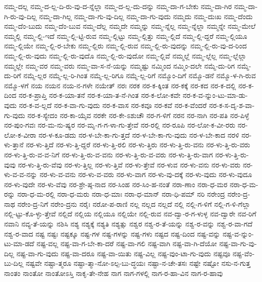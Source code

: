 {ನಮ್ಮ-ದಲ್ಲ
ನಮ್ಮ-ದ-ಲ್ಲ-ದಿ-ರು-ವು-ದ-ನ್ನೆಲ್ಲಾ
ನಮ್ಮ-ದ-ಲ್ಲ-ದು-ದನ್ನು
ನಮ್ಮ-ದಾ-ಗ-ಬೇಕು
ನಮ್ಮ-ದಾ-ಗಿರ
ನಮ್ಮ-ದಾ-ಗಿ-ರು-ವು-ದಿಲ್ಲ
ನಮ್ಮ-ದಾ-ಗಿಲ್ಲ
ನಮ್ಮ-ದಾ-ಗು-ವು-ದಿಲ್ಲ
ನಮ್ಮ-ದಾ-ಗು-ವುದು
ನಮ್ಮದು
ನಮ್ಮ-ದುಃಖ
ನಮ್ಮ-ದೆಂದು
ನಮ್ಮ-ದೆಂ-ಬುದು
ನಮ್ಮ-ದೆಂ-ಬುವ
ನಮ್ಮ-ದೆಲ್ಲ
ನಮ್ಮದೇ
ನಮ್ಮನ್ನು
ನಮ್ಮ-ನ್ನೆಲ್ಲ
ನಮ್ಮ-ನ್ನೆಲ್ಲಾ
ನಮ್ಮನ್ನೇ
ನಮ್ಮ-ಮೇಲೆ
ನಮ್ಮಲ್ಲಿ
ನಮ್ಮ-ಲ್ಲಿ-ಇದೆ
ನಮ್ಮ-ಲ್ಲಿ-ಟ್ಟಿ-ರುವ
ನಮ್ಮ-ಲ್ಲಿಟ್ಟು
ನಮ್ಮ-ಲ್ಲಿತ್ತು
ನಮ್ಮ-ಲ್ಲಿದೆ
ನಮ್ಮ-ಲ್ಲಿ-ದ್ದರೆ
ನಮ್ಮ-ಲ್ಲಿಯೂ
ನಮ್ಮ-ಲ್ಲಿಯೇ
ನಮ್ಮ-ಲ್ಲಿ-ರ-ಬೇಕು
ನಮ್ಮ-ಲ್ಲಿರು
ನಮ್ಮ-ಲ್ಲಿ-ರುವ
ನಮ್ಮ-ಲ್ಲಿ-ರು-ವುದನ್ನು
ನಮ್ಮ-ಲ್ಲಿ-ರು-ವು-ದ-ರಿಂದ
ನಮ್ಮ-ಲ್ಲಿ-ರು-ವುದು
ನಮ್ಮ-ಲ್ಲಿ-ರು-ವುದೊ
ನಮ್ಮ-ಲ್ಲಿ-ರು-ವುದೋ
ನಮ್ಮ-ಲ್ಲಿವೆ
ನಮ್ಮಲ್ಲೆ
ನಮ್ಮ-ಲ್ಲೆಲ್ಲ
ನಮ್ಮ-ಲ್ಲೆಲ್ಲಾ
ನಮ್ಮಲ್ಲೇ
ನಮ್ಮ-ವರ
ನಮ್ಮ-ವರು
ನಮ್ಮ-ವಾ-ಸ-ನೆ-ಯನ್ನು
ನಮ್ಮಷ್ಟು
ನಮ್ಮಿಂದ
ನಮ್ಮಿಂ-ದಲೇ
ನಮ್ಮೆ-ದು-ರಿಗ
ನಮ್ಮೆ-ದು-ರಿಗೆ
ನಮ್ಮೆ-ಲ್ಲರ
ನಮ್ಮೆ-ಲ್ಲ-ರಿ-ಗಿಂತ
ನಮ್ಮೆ-ಲ್ಲ-ರಿಗೂ
ನಮ್ಮೆ-ಲ್ಲ-ರಿಗೆ
ನಮ್ಮೊಂ-ದಿಗೆ
ನಮ್ಮೊ-ಡನೆ
ನಮ್ಮೊ-ಳ-ಗಿ-ರುವ
ನಮ್ಮೊ-ಳಗೆ
ನಯ
ನಯನ
ನಯ-ನ-ಗಳೇ
ನಯೇತ್
ನರಃ
ನರಕ
ನರ-ಕ-ಕ್ಕಿಂತ
ನರ-ಕಕ್ಕೆ
ನರ-ಕದ
ನರ-ಕ-ದಲ್ಲಿ
ನರ-ಕ-ದಿಂದ
ನರ-ಕ-ಪ್ರಾಪ್ತಿ
ನರ-ಕ-ಯಾ-ತನೆ
ನರ-ಕ-ಯಾ-ತ-ನೆ-ಗಿಂತ
ನರ-ಕ-ಲೋ-ಕವೇ
ನರ-ಕ-ವ-ನ್ನುಂ-ಟು-ಮಾ-ಡು-ವುದು
ನರ-ಕ-ವ-ಲ್ಲದೆ
ನರ-ಕ-ವಾ-ಗು-ವುದು
ನರ-ಕ-ವಾಸ
ನರ-ಕವೂ
ನರ-ಕವೆ
ನರ-ಕ-ವೆಂದರೆ
ನರ-ಕ-ಸ-ದೃ-ಶ-ವಾ-ಗು-ವುದು
ನರ-ಕ-ಸ್ಯೇದಂ
ನರ-ಕಾ-ಯೈವ
ನರಕೇ
ನರ-ಕೇ-ಽಶುಚೌ
ನರ-ಗ-ಳಿಗೆ
ನರನ
ನರ-ನಾಗಿ
ನರ-ಪತಿ
ನರ-ಪಿಳ್ಳೆ
ನರ-ಪುಂ-ಗವಃ
ನರ-ಮ-ನು-ಷ್ಯರ
ನರ-ಮೃ-ಗ-ಗ-ಳಾ-ಗು-ತ್ತೇವೆ
ನರ-ರಲ್ಲಿ
ನರ-ರೂಪಿ
ನರ-ಲೋ-ಕ-ವೀ-ರರು
ನರ-ಲೋ-ಕ-ವೀರಾ
ನರ-ಳ-ಕೂ-ಡದು
ನರ-ಳ-ಬೇ-ಕಾ-ಗು-ತ್ತದೆ
ನರ-ಳ-ಬೇ-ಕಾ-ಗು-ವುದು
ನರ-ಳ-ಬೇ-ಕಾದ
ನರಳಿ
ನರ-ಳು-ತ್ತಾನೆ
ನರ-ಳು-ತ್ತಿದೆ
ನರ-ಳು-ತ್ತಿ-ದ್ದರೆ
ನರ-ಳು-ತ್ತಿ-ರಲಿ
ನರ-ಳು-ತ್ತಿರು
ನರ-ಳು-ತ್ತಿ-ರು-ವನು
ನರ-ಳು-ತ್ತಿ-ರು-ವರು
ನರ-ಳು-ತ್ತಿ-ರು-ವ-ವ-ನಿಗೆ
ನರ-ಳು-ತ್ತಿ-ರು-ವ-ವನು
ನರ-ಳು-ತ್ತಿ-ರು-ವ-ವರು
ನರ-ಳು-ತ್ತಿ-ರು-ವಾಗ
ನರ-ಳು-ತ್ತಿ-ರು-ವುವು
ನರ-ಳು-ತ್ತಿ-ರು-ವೆವು
ನರ-ಳು-ತ್ತಿಲ್ಲ
ನರ-ಳು-ತ್ತಿವೆ
ನರ-ಳು-ತ್ತೇವೆ
ನರ-ಳುವ
ನರ-ಳು-ವನು
ನರ-ಳು-ವರು
ನರ-ಳು-ವ-ವ-ನನ್ನು
ನರ-ಳು-ವ-ವನು
ನರ-ಳು-ವ-ವರು
ನರ-ಳು-ವಾಗ
ನರ-ಳು-ವು-ದಕ್ಕೆ
ನರ-ಳು-ವುದು
ನರ-ಳು-ವುದೂ
ನರ-ಳು-ವುದೇ
ನರ-ಳು-ವೆವು
ನರ-ಶ್ರೇ-ಷ್ಠ-ನಾದ
ನರ-ಸಿಂಹ
ನರ-ಸಿಂ-ಹ-ನಂತೆ
ನರಾ-ಣಾಂ
ನರಾ-ಧ-ಮರ
ನರಾ-ಧ-ಮ-ರನ್ನು
ನರಾ-ಧ-ಮ-ರಲ್ಲಿ
ನರಾ-ಧ-ಮರು
ನರಾ-ಧ-ಮಾಃ
ನರಾ-ಧ-ಮಾನ್
ನರಾ-ಧಿ-ಪಮ್
ನರಿ
ನರೇಂದ್ರ
ನರೇಂ-ದ್ರ-ನಾಥ
ನರೇಂ-ದ್ರ-ನಿಗೆ
ನರೇಂ-ದ್ರನು
ನರೈಃ
ನರೋ-ಪ-ರಾಣಿ
ನಲ್ಲ
ನಲ್ಲದ
ನಲ್ಲದೆ
ನಲ್ಲಿ
ನಲ್ಲಿ-ಗ-ಳಿಗೆ
ನಲ್ಲಿ-ಗ-ಳಿ-ಗೆಲ್ಲಾ
ನಲ್ಲಿ-ಟ್ಟು-ಕೊ-ಳ್ಳು-ತ್ತೇವೆ
ನಲ್ಲಿದೆ
ನಲ್ಲಿಯ
ನಲ್ಲಿಯೂ
ನಲ್ಲಿಯೇ
ನಲ್ಲಿ-ರುವ
ನವ-ದ್ವಾ-ರ-ಗ-ಳುಳ್ಳ
ನವ-ದ್ವಾರೇ
ನವ-ರಿಗೆ
ನವಾನಿ
ನವ್ಯ-ತೆ-ಯನ್ನು
ನಶಿಸಿ
ನಶ್ಯ
ನಶ್ಯಕ್ಕೆ
ನಶ್ಯತಿ
ನಶ್ಯತ್ಸು
ನಶ್ವರ
ನಶ್ವ-ರ-ತೆ-ಯನ್ನು
ನಶ್ವ-ರ-ವನ್ನು
ನಶ್ವ-ರ-ವಾ-ಗದೆ
ನಶ್ವ-ರ-ವಾದ
ನಷ್ಟ
ನಷ್ಟಃ
ನಷ್ಟಕ್ಕೂ
ನಷ್ಟ-ಗಳ
ನಷ್ಟ-ಗಳನ್ನು
ನಷ್ಟ-ಗಳು
ನಷ್ಟದ
ನಷ್ಟ-ದಿಂದ
ನಷ್ಟ-ವನ್ನು
ನಷ್ಟ-ವ-ನ್ನುಂ-ಟು-ಮಾ-ಡದೆ
ನಷ್ಟ-ವಲ್ಲ
ನಷ್ಟ-ವಾ-ಗ-ಬೇ-ಕಾ-ದರೆ
ನಷ್ಟ-ವಾ-ಗಲಿ
ನಷ್ಟ-ವಾಗಿ
ನಷ್ಟ-ವಾ-ಗಿ-ದೆಯೋ
ನಷ್ಟ-ವಾ-ಗು-ವು-ದಿಲ್ಲ
ನಷ್ಟ-ವಾ-ಗು-ವುದು
ನಷ್ಟ-ವಾ-ದರೂ
ನಷ್ಟ-ವಾ-ಯಿತು
ನಷ್ಟ-ವಿಲ್ಲ
ನಷ್ಟ-ವುಂ-ಟಾ-ಗು-ವುದು
ನಷ್ಟವೂ
ನಷ್ಟ-ವೆಂ-ಬು-ದಿಲ್ಲ
ನಷ್ಟವೇ
ನಷ್ಟಾ-ತ್ಮರೂ
ನಷ್ಟಾ-ತ್ಮಾ-ನೋ-ಽಲ್ಪ-ಬು-ದ್ಧಯಃ
ನಷ್ಟಾ-ನ-ಚೇ-ತಸಃ
ನಷ್ಟೇ
ನಷ್ಟೋ
ನಸು-ನ-ಗುತ್ತ
ನಾಂತಂ
ನಾಂತೋ
ನಾಂತೋಽಸ್ತಿ
ನಾಕೃ-ತೇ-ನೇಹ
ನಾಗ
ನಾಗ-ಗಳಲ್ಲಿ
ನಾಗ-ರ-ಹಾ-ವಿನ
ನಾಗ-ರ-ಹಾವು
}
